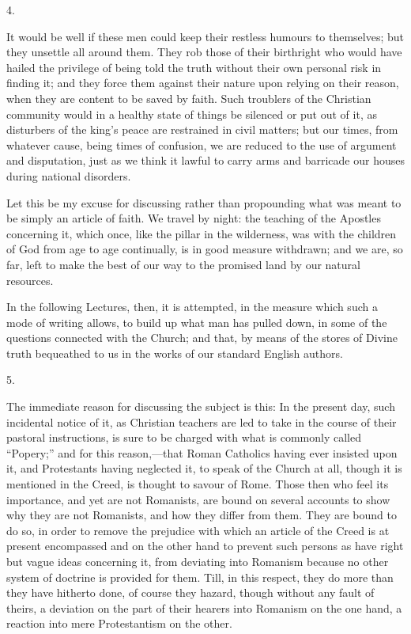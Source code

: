 4.

It would be well if these men could keep their restless humours to
themselves; but they unsettle all around them. They rob those of their
birthright who would have hailed the privilege of being told the truth
without their own personal risk in finding it; and they force them
against their nature upon relying on their reason, when they are
content to be saved by faith. Such troublers of the Christian
community would in a healthy state of things be silenced or put out of
it, as disturbers of the king's peace are restrained in civil
matters; but our times, from whatever cause, being times of confusion,
we are reduced to the use of argument and disputation, just as we
think it lawful to carry arms and barricade our houses during national
disorders.

Let this be my excuse for discussing rather than propounding what
was meant to be simply an article of faith. We travel by night: the
teaching of the Apostles concerning it, which once, like the pillar in
the wilderness, was with the children of God from age to age
continually, is in good measure withdrawn; and we are, so far, left to
make the best of our way to the promised land by our natural
resources.

In the following Lectures, then, it is attempted, in the measure
which such a mode of writing allows, to build up what man has pulled
down, in some of the questions connected with the Church; and that, by
means of the stores of Divine truth bequeathed to us in the works of
our standard English authors.

5.

The immediate reason for discussing the subject is this: In the
present day, such incidental notice of it, as Christian teachers are
led to take in the course of their pastoral instructions, is sure to
be charged with what is commonly called ``Popery;'' and for
this reason,—that Roman Catholics having ever insisted upon it, and
Protestants having neglected it, to speak of the Church at all, though
it is mentioned in the Creed, is thought to savour of Rome. Those then
who feel its importance, and yet are not Romanists, are bound on
several accounts to show why they are not Romanists, and how they
differ from them. They are bound to do so, in order to remove the
prejudice with which an article of the Creed is at present encompassed
and on the other hand to prevent such persons as have right but vague
ideas concerning it, from deviating into Romanism because no other
system of doctrine is provided for them. Till, in this respect,
they do more than they have hitherto done, of course they hazard,
though without any fault of theirs, a deviation on the part of their
hearers into Romanism on the one hand, a reaction into mere
Protestantism on the other.

